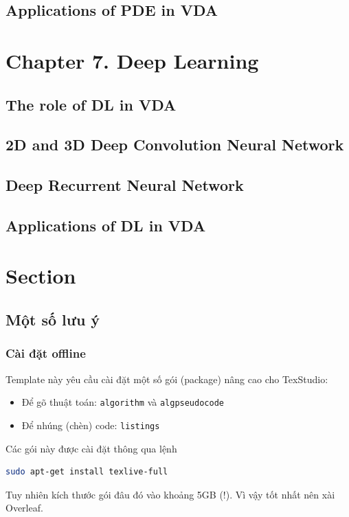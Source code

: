 \subsection{Applications of PDE in VDA}

\section{Chapter 7. Deep Learning}
\subsection{The role of DL in VDA}
\subsection{2D and 3D Deep Convolution Neural Network}
\subsection{Deep Recurrent Neural Network}
\subsection{Applications of DL in VDA}

% 











\section{Section}

\subsection{Một số lưu ý}

\subsubsection{Cài đặt offline}
Template này yêu cầu cài đặt một số gói (package) nâng cao cho TexStudio:
\begin{itemize}
\item Để gõ thuật toán: \texttt{algorithm} và \texttt{algpseudocode}
\item Để nhúng (chèn) code: \texttt{listings}
\end{itemize}
Các gói này được cài đặt thông qua lệnh
\begin{lstlisting}[language=sh]
sudo apt-get install texlive-full
\end{lstlisting}
Tuy nhiên kích thước gói đâu đó vào khoảng 5GB (!). Vì vậy tốt nhất nên xài Overleaf.

